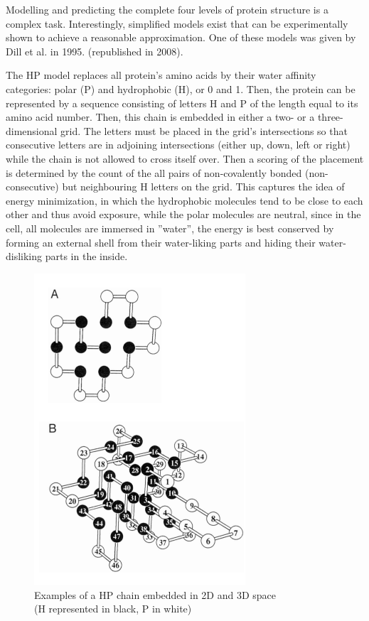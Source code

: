 Modelling and predicting the complete four levels of protein structure is a complex task. Interestingly, simplified models exist that can be experimentally shown to achieve a reasonable approximation. One of these models was given by Dill et al. in 1995. (republished in 2008).\cite{dill_principles_2008} 

The HP model replaces all protein's amino acids by their water affinity categories: polar (P) and hydrophobic (H), or 0 and 1. Then, the protein can be represented by a sequence consisting of letters H and P of the length equal to its amino acid number. Then, this chain is embedded in either a two- or a three-dimensional grid. The letters must be placed in the grid's intersections so that consecutive letters are in adjoining intersections (either up, down, left or right) while the chain is not allowed to cross itself over. Then a scoring of the placement is determined by the count of the all pairs of non-covalently bonded (non-consecutive) but neighbouring H letters on the grid. This captures the idea of energy minimization, in which the hydrophobic molecules tend to be close to each other and thus avoid exposure, while the polar molecules are neutral, since in the cell, all molecules are immersed in ''water'', the energy is best conserved by forming an external shell from their water-liking parts and hiding their water-disliking parts in the inside.

\begin{figure}[H]
    \centering
    \includegraphics[width=0.7\textwidth]{figures/bioinformatics/hp_model.png}
    \caption{Examples of a HP chain embedded in 2D and 3D space\\(H represented in black, P in white)\cite{dill_principles_2008}}
\end{figure}

